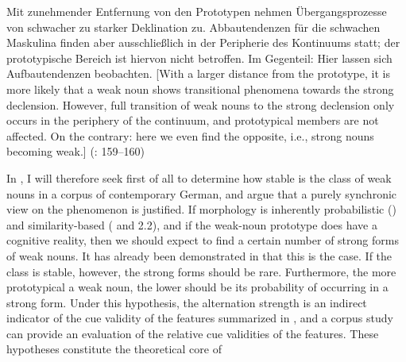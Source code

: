 \begin{styleMoutonQuote}
Mit zunehmender Entfernung von den Prototypen nehmen Übergangsprozesse von schwacher zu starker Deklination zu. Abbautendenzen für die schwachen Maskulina finden aber ausschließlich in der Peripherie des Kontinuums statt; der prototypische Bereich ist hiervon nicht betroffen. Im Gegenteil: Hier lassen sich Aufbautendenzen beobachten. [With a larger distance from the prototype, it is more likely that a weak noun shows transitional phenomena towards the strong declension. However, full transition of weak nouns to the strong declension only occurs in the periphery of the continuum, and prototypical members are not affected. On the contrary: here we even find the opposite, i.e., strong nouns becoming weak.] (\citealt{Köpcke1995}: 159–160)
\end{styleMoutonQuote}

\begin{styleMoutonText}
In , I will therefore seek first of all to determine how stable is the class of weak nouns in a corpus of contemporary German, and argue that a purely synchronic view on the phenomenon is justified. If morphology is inherently probabilistic () and similarity-based ( and 2.2), and if the weak-noun prototype does have a cognitive reality, then we should expect to find a certain number of strong forms of weak nouns. It has already been demonstrated in  that this is the case. If the class is stable, however, the strong forms should be rare. Furthermore, the more prototypical a weak noun, the lower should be its probability of occurring in a strong form. Under this hypothesis, the alternation strength is an indirect indicator of the cue validity of the features summarized in , and a corpus study can provide an evaluation of the relative cue validities of the features. These hypotheses constitute the theoretical core of 
\end{styleMoutonText}

